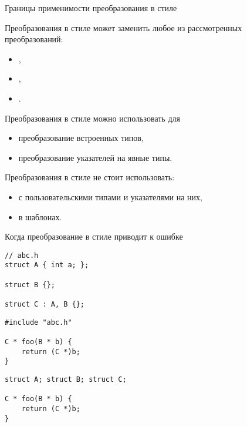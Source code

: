 \documentclass{beamer}
\begin{document}
\begin{frame}[fragile]{Границы применимости преобразования в стиле \langc}{}
  \begin{itemize}
    \pitem Преобразования в стиле \langc может заменить любое из рассмотренных преобразований: 
    \begin{itemize}
        \item {},
        \item {},
        \item {}.
    \end{itemize}

    \pitem Преобразования в стиле \langc можно использовать для
    \begin{itemize}
        \item преобразование встроенных типов,
        \item преобразование указателей на явные типы.
    \end{itemize}

    \pitem Преобразования в стиле \langc не стоит использовать:
    \begin{itemize}
        \item с пользовательскими типами и указателями на них,
        \item в шаблонах.        
    \end{itemize}
  \end{itemize}
\end{frame}

\begin{frame}[fragile]{Когда преобразование в стиле \langc приводит к ошибке}{}
\begin{lstlisting}
// abc.h
struct A { int a; };

struct B {};

struct C : A, B {};
\end{lstlisting}

\pause
\begin{minipage}{.45\textwidth}
\begin{lstlisting}
#include "abc.h"

C * foo(B * b) {
    return (C *)b;
}
\end{lstlisting}


\end{minipage}\pause\hfill
\begin{minipage}{.51\textwidth}
\begin{lstlisting}
struct A; struct B; struct C;

C * foo(B * b) {
    return (C *)b;
}
\end{lstlisting}
\end{minipage}
\end{frame}
\end{document}
